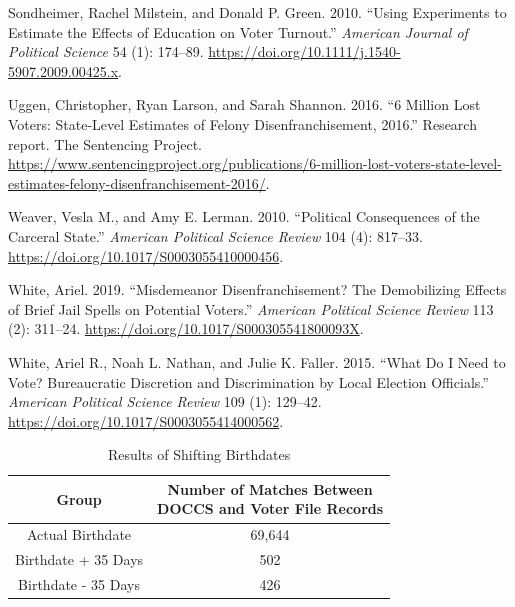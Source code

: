 \documentclass[
  12pt,
]{article}
\newlength{\cslhangindent}
\newenvironment{cslreferences}%
  {\setlength{\parindent}{0pt}%
  \everypar{\setlength{\hangindent}{\cslhangindent}}\ignorespaces}%
  {\par}
\begin{document}
\begin{cslreferences}
\leavevmode\hypertarget{ref-Sondheimer2010}{}%
Sondheimer, Rachel Milstein, and Donald P. Green. 2010. ``Using Experiments to Estimate the Effects of Education on Voter Turnout.'' \emph{American Journal of Political Science} 54 (1): 174--89. \url{https://doi.org/10.1111/j.1540-5907.2009.00425.x}.

\leavevmode\hypertarget{ref-sentencing_2016}{}%
Uggen, Christopher, Ryan Larson, and Sarah Shannon. 2016. ``6 Million Lost Voters: State-Level Estimates of Felony Disenfranchisement, 2016.'' Research report. The Sentencing Project. \url{https://www.sentencingproject.org/publications/6-million-lost-voters-state-level-estimates-felony-disenfranchisement-2016/}.

\leavevmode\hypertarget{ref-Weaver2010}{}%
Weaver, Vesla M., and Amy E. Lerman. 2010. ``Political Consequences of the Carceral State.'' \emph{American Political Science Review} 104 (4): 817--33. \url{https://doi.org/10.1017/S0003055410000456}.

\leavevmode\hypertarget{ref-White2019}{}%
White, Ariel. 2019. ``Misdemeanor Disenfranchisement? The Demobilizing Effects of Brief Jail Spells on Potential Voters.'' \emph{American Political Science Review} 113 (2): 311--24. \url{https://doi.org/10.1017/S000305541800093X}.

\leavevmode\hypertarget{ref-White2015}{}%
White, Ariel R., Noah L. Nathan, and Julie K. Faller. 2015. ``What Do I Need to Vote? Bureaucratic Discretion and Discrimination by Local Election Officials.'' \emph{American Political Science Review} 109 (1): 129--42. \url{https://doi.org/10.1017/S0003055414000562}.
\end{cslreferences}

\newpage

\begin{singlespace}
\begin{table}[H]

\caption{\label{tab:shift-dobs-chunk}\label{tab:change-dobs} Results of Shifting Birthdates}
\centering
\begin{tabular}[t]{cc}
\toprule
Group & \makecell[l]{Number of Matches Between\\DOCCS and Voter File Records}\\
\midrule
Actual Birthdate & 69,644\\
Birthdate + 35 Days & 502\\
Birthdate - 35 Days & 426\\
\bottomrule
\end{tabular}
\end{table}










\end{singlespace}
\end{document}
